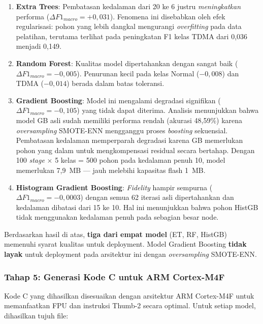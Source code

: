 \begin{enumerate}
    \item \textbf{Extra Trees}: Pembatasan kedalaman dari 20 ke 6 justru \textit{meningkatkan} performa ($\Delta F1_{macro} = +0{,}031$). Fenomena ini disebabkan oleh efek regularisasi: pohon yang lebih dangkal mengurangi \textit{overfitting} pada data pelatihan, terutama terlihat pada peningkatan F1 kelas TDMA dari 0,036 menjadi 0,149.

    \item \textbf{Random Forest}: Kualitas model dipertahankan dengan sangat baik ($\Delta F1_{macro} = -0{,}005$). Penurunan kecil pada kelas Normal ($-0{,}008$) dan TDMA ($-0{,}014$) berada dalam batas toleransi.

    \item \textbf{Gradient Boosting}: Model ini mengalami degradasi signifikan ($\Delta F1_{macro} = -0{,}105$) yang tidak dapat diterima. Analisis menunjukkan bahwa model GB asli sudah memiliki performa rendah (akurasi 48,59\%) karena \textit{oversampling} SMOTE-ENN mengganggu proses \textit{boosting} sekuensial. Pembatasan kedalaman memperparah degradasi karena GB memerlukan pohon yang dalam untuk mengkompensasi residual secara bertahap. Dengan 100 \textit{stage} $\times$ 5 kelas = 500 pohon pada kedalaman penuh 10, model memerlukan 7,9~MB --- jauh melebihi kapasitas flash 1~MB.

    \item \textbf{Histogram Gradient Boosting}: \textit{Fidelity} hampir sempurna ($\Delta F1_{macro} = -0{,}0003$) dengan semua 62 iterasi asli dipertahankan dan kedalaman dibatasi dari 15 ke 10. Hal ini menunjukkan bahwa pohon HistGB tidak menggunakan kedalaman penuh pada sebagian besar node.
\end{enumerate}

Berdasarkan hasil di atas, \textbf{tiga dari empat model} (ET, RF, HistGB) memenuhi syarat kualitas untuk deployment. Model Gradient Boosting \textbf{tidak layak} untuk deployment pada arsitektur ini dengan \textit{oversampling} SMOTE-ENN.

\subsubsection{Tahap 5: Generasi Kode C untuk ARM Cortex-M4F}

Kode C yang dihasilkan disesuaikan dengan arsitektur ARM Cortex-M4F untuk memanfaatkan FPU dan instruksi Thumb-2 secara optimal. Untuk setiap model, dihasilkan tujuh file:

